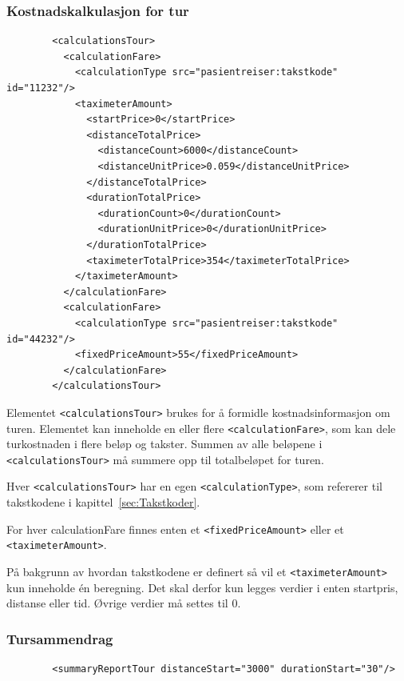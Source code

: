 \documentclass[a4paper,titlepage,norsk,11pt]{article}
\begin{document}
\subsubsection{Kostnadskalkulasjon for tur}

\begin{lstlisting}
        <calculationsTour>
          <calculationFare>
            <calculationType src="pasientreiser:takstkode" id="11232"/>
            <taximeterAmount>
              <startPrice>0</startPrice>
              <distanceTotalPrice>
                <distanceCount>6000</distanceCount>
                <distanceUnitPrice>0.059</distanceUnitPrice>
              </distanceTotalPrice>
              <durationTotalPrice>
                <durationCount>0</durationCount>
                <durationUnitPrice>0</durationUnitPrice>
              </durationTotalPrice>
              <taximeterTotalPrice>354</taximeterTotalPrice>
            </taximeterAmount>
          </calculationFare>
          <calculationFare>
            <calculationType src="pasientreiser:takstkode" id="44232"/>
            <fixedPriceAmount>55</fixedPriceAmount>
          </calculationFare>
        </calculationsTour>
\end{lstlisting}

Elementet \lstinline{<calculationsTour>} brukes for å formidle kostnadsinformasjon om turen. Elementet kan inneholde en eller flere \lstinline{<calculationFare>}, som kan dele turkostnaden i flere beløp og takster. Summen av alle beløpene i \lstinline{<calculationsTour>} må summere opp til totalbeløpet for turen.

Hver \lstinline{<calculationsTour>} har en egen \lstinline{<calculationType>}, som refererer til takstkodene i kapittel~\ref{sec:Takstkoder}.

For hver calculationFare finnes enten et \lstinline{<fixedPriceAmount>} eller et \lstinline{<taximeterAmount>}.

På bakgrunn av hvordan takstkodene er definert så vil et \lstinline{<taximeterAmount>} kun inneholde én beregning. Det skal derfor kun legges verdier i enten startpris, distanse eller tid. Øvrige verdier må settes til 0.

\subsubsection{Tursammendrag}

\begin{lstlisting}
        <summaryReportTour distanceStart="3000" durationStart="30"/>
\end{lstlisting}
\end{document}
